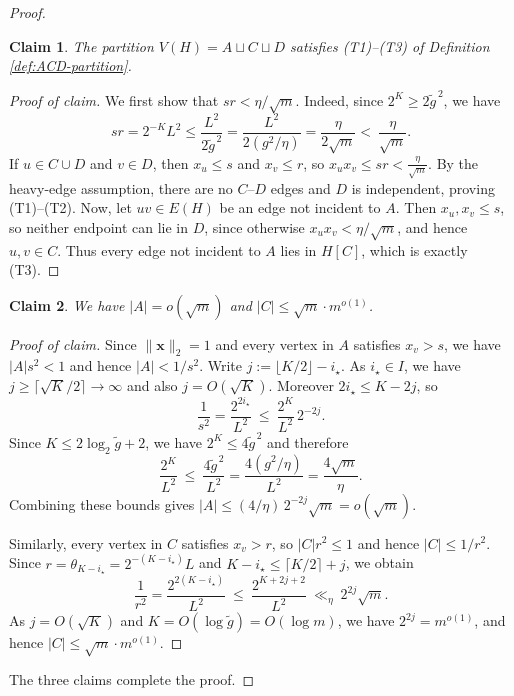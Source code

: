 \documentclass[11pt]{article}
\newtheorem{claim}{Claim}
\theoremstyle{definition}
\theoremstyle{plain}
\newenvironment{poc}{\begin{proof}[Proof of claim]\renewcommand*{\qedsymbol}{$\blacksquare$}}{\end{proof}}
\begin{document}
\begin{proof}
\begin{claim}
    The partition $V(H)=A\sqcup C\sqcup D$ satisfies \textup{(T1)}--\textup{(T3)} of Definition \ref{def:ACD-partition}. 
\end{claim}

\begin{poc}
We first show that $sr<\eta/\sqrt m$.
Indeed, since $2^K\ge 2\widetilde g^{\,2}$, we have
\[
  sr
  =
  2^{-K}L^2
  \le
  \frac{L^2}{2\widetilde g^{\,2}}
  =
  \frac{L^2}{2(g^2/\eta)}
  =
  \frac{\eta}{2\sqrt m}
  <\ \frac{\eta}{\sqrt m}.
\]
If $u\in C\cup D$ and $v\in D$, then $x_u\le s$ and $x_v\le r$, so $x_ux_v\le sr< \frac{\eta}{\sqrt m}$.
By the heavy-edge assumption, there are no $C$--$D$ edges and $D$ is independent, proving \textup{(T1)}--\textup{(T2)}. 
Now, let $uv\in E(H)$ be an edge not incident to $A$.
Then $x_u,x_v\le s$, so neither endpoint can lie in $D$, since otherwise \(x_ux_v<\eta/\sqrt m\), and hence $u,v\in C$.
Thus every edge not incident to $A$ lies in $H[C]$, which is exactly \textup{(T3)}.
\end{poc}

\begin{claim}
    We have $|A|=o(\sqrt m)$ and 
  $|C|\le \sqrt m\cdot m^{o(1)}$. 
\end{claim}

\begin{poc}
Since $\|\bm{x}\|_2=1$ and every vertex in $A$ satisfies $x_v>s$, we have $|A|s^2<1$ and hence $|A|<1/s^2$.
Write $j:=\lfloor K/2\rfloor-i_\star$.
As $i_\star\in I$, we have $j\ge \lceil \sqrt K/2\rceil\to\infty$ and also $j=O(\sqrt K)$.
Moreover $2i_\star\le K-2j$, so
\[
  \frac{1}{s^2}=\frac{2^{2i_\star}}{L^2}\ \le\ \frac{2^K}{L^2}\,2^{-2j}.
\]
Since $K\le 2\log_2 \widetilde g+2$, we have $2^K\le 4\widetilde g^{\,2}$ and therefore
\[
  \frac{2^K}{L^2}\ \le\ \frac{4\widetilde g^{\,2}}{L^2}
  =\frac{4(g^2/\eta)}{L^2}
  =\frac{4\sqrt m}{\eta}.
\]
Combining these bounds gives $|A|\le (4/\eta)\,2^{-2j}\sqrt m=o(\sqrt m)$.

Similarly, every vertex in $C$ satisfies $x_v>r$, so $|C|r^2\le 1$ and hence $|C|\le 1/r^2$.
Since $r=\theta_{K-i_\star}=2^{-(K-i_\star)}L$ and $K-i_\star\le \lceil K/2\rceil+j$, we obtain
\[
  \frac{1}{r^2}=\frac{2^{2(K-i_\star)}}{L^2}\ \le\ \frac{2^{K+2j+2}}{L^2}
  \ \ll_\eta\ 2^{2j}\sqrt m.
\]
As $j=O(\sqrt K)$ and $K=O(\log \widetilde g)=O(\log m)$, we have $2^{2j}=m^{o(1)}$, and hence $|C|\le \sqrt m\cdot m^{o(1)}.$
\end{poc}

The three claims complete the proof.
\end{proof}
\end{document}
